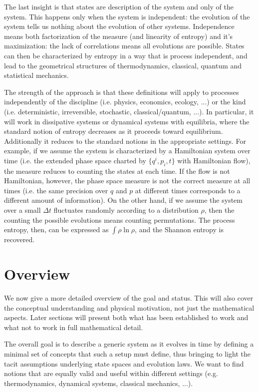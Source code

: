 \documentclass[10pt, onecolumn, longbibliography, nofootinbib]{revtex4-2}
\begin{document}
The last insight is that states are description of the system and only of the system. This happens only when the system is independent: the evolution of the system tells us nothing about the evolution of other systems. Independence means both factorization of the measure (and linearity of entropy) and it's maximization: the lack of correlations means all evolutions are possible. States can then be characterized by entropy in a way that is process independent, and lead to the geometrical structures of thermodynamics, classical, quantum and statistical mechanics.

The strength of the approach is that these definitions will apply to processes independently of the discipline (i.e. physics, economics, ecology, ...)  or the kind (i.e. deterministic, irreversible, stochastic, classical/quantum, ...). In particular, it will work in dissipative systems or dynamical systems with equilibria, where the standard notion of entropy decreases as it proceeds toward equilibrium. Additionally it reduces to the standard notions in the appropriate settings. For example, if we assume the system is characterized by a Hamiltonian system over time (i.e. the extended phase space charted by $\{q^i, p_i, t\}$ with Hamiltonian flow), the measure reduces to counting the states at each time. If the flow is not Hamiltonian, however, the phase space measure is not the correct measure at all times (i.e. the same precision over $q$ and $p$ at different times corresponds to a different amount of information). On the other hand, if we assume the system over a small $\Delta t$ fluctuates randomly according to a distribution $\rho$, then the counting the possible evolutions means counting permutations. The process entropy, then, can be expressed as $\int \rho \ln \rho$, and the Shannon entropy is recovered.


\section{Overview}

We now give a more detailed overview of the goal and status. This will also cover the conceptual understanding and physical motivation, not just the mathematical aspects. Later sections will present both what has been established to work and what not to work in full mathematical detail.

The overall goal is to describe a generic system as it evolves in time by defining a minimal set of concepts that such a setup must define, thus bringing to light the tacit assumptions underlying state spaces and evolution laws. We want to find notions that are equally valid and useful within different settings (e.g. thermodynamics, dynamical systems, classical mechanics, ...).
\end{document}
